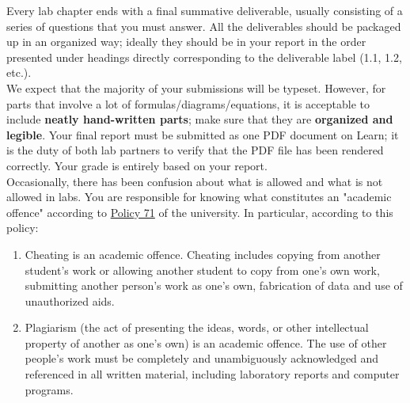 Every lab chapter ends with a final summative deliverable, usually
consisting of a series of questions that you must answer.
%
All the deliverables should be packaged up in an organized way; ideally
they should be in your report in the order presented under headings directly corresponding to the deliverable label (1.1, 1.2, etc.). \\

We expect that the majority of your submissions will be typeset. However, for parts that involve a lot of formulas/diagrams/equations, it is acceptable to include \textbf {neatly hand-written parts}; make sure that they are \textbf {organized and legible}.
Your final report must be submitted as one PDF document on Learn; it is the duty of both lab partners to verify that the PDF file has been rendered correctly.
Your grade is entirely based on your report.\\

Occasionally, there has been confusion about what is allowed and what is not allowed in labs. You are responsible for knowing what constitutes an "academic offence" according to \href{https://uwaterloo.ca/secretariat/policies-procedures-guidelines/policy-71} {Policy 71} of the university. In particular, according to this policy:
\begin{enumerate}
\item{Cheating is an academic offence. Cheating includes copying from another student's work or allowing another student to copy from one's own work, submitting another person's work as one's own, fabrication of data and use of unauthorized aids.}
\item{Plagiarism (the act of presenting the ideas, words, or other intellectual property of another as one's own) is an academic offence. The use of other people's work must be completely and unambiguously acknowledged and referenced in all written material, including laboratory reports and computer programs.}
\end{enumerate}

